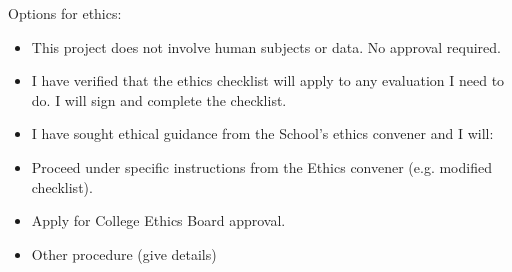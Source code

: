 \documentclass[11pt]{article}
\begin{document}
Options for ethics:
\begin{itemize}  
    \item This project does not involve human subjects or data. No approval required.
    \item I have verified that the ethics checklist will apply to any evaluation I need to do. I will sign and complete the checklist.
    \item I have sought ethical guidance from the School's ethics convener and I will:
\end{itemize}
\begin{itemize}
    \item Proceed under specific instructions from the Ethics convener (e.g. modified checklist).
    \item Apply for College Ethics Board approval.
    \item Other procedure (give details)
\end{itemize}    
\end{document}
